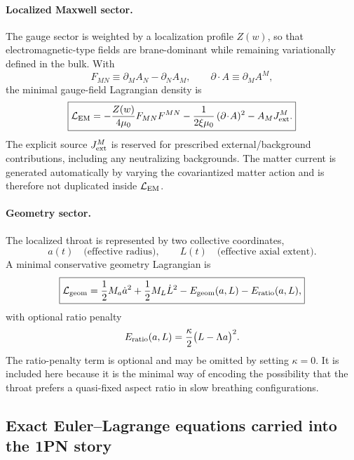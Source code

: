 \documentclass[11pt]{article}
\newcommand{\Zloc}{Z}
\begin{document}
\paragraph{Localized Maxwell sector.}
The gauge sector is weighted by a localization profile \(\Zloc(w)\), so that
electromagnetic-type fields are brane-dominant while remaining variationally defined in
the bulk. With
\begin{equation}
F_{MN}\equiv \partial_M A_N-\partial_N A_M,
\qquad
\partial\!\cdot\!A\equiv \partial_M A^M,
\label{eq:app-FMN}
\end{equation}
the minimal gauge-field Lagrangian density is
\begin{equation}
\boxed{
\mathcal L_{\rm EM}
=
-\frac{\Zloc(w)}{4\mu_0}F_{MN}F^{MN}
-\frac{1}{2\xi\mu_0}\,(\partial\!\cdot\!A)^2
- A_M J_{\rm ext}^M.
}
\label{eq:app-LEM}
\end{equation}
The explicit source \(J_{\rm ext}^M\) is reserved for prescribed external/background
contributions, including any neutralizing backgrounds. The matter current is generated
automatically by varying the covariantized matter action and is therefore not duplicated
inside \(\mathcal L_{\rm EM}\).

\paragraph{Geometry sector.}
The localized throat is represented by two collective coordinates,
\begin{equation}
a(t)\quad \text{(effective radius)},
\qquad
L(t)\quad \text{(effective axial extent)}.
\label{eq:app-a-L}
\end{equation}
A minimal conservative geometry Lagrangian is
\begin{equation}
\boxed{
\mathcal L_{\rm geom}
=
\frac12 M_a \dot a^2
+
\frac12 M_L \dot L^2
-
E_{\rm geom}(a,L)
-
E_{\rm ratio}(a,L),
}
\label{eq:app-Lgeom}
\end{equation}
with optional ratio penalty
\begin{equation}
E_{\rm ratio}(a,L)
=
\frac{\kappa}{2}\bigl(L-\Lambda a\bigr)^2.
\label{eq:app-Eratio}
\end{equation}
The ratio-penalty term is optional and may be omitted by setting \(\kappa=0\). It is
included here because it is the minimal way of encoding the possibility that the throat
prefers a quasi-fixed aspect ratio in slow breathing configurations.

\subsection{Exact Euler--Lagrange equations carried into the 1PN story}
\label{app:variational-eom}
\end{document}
